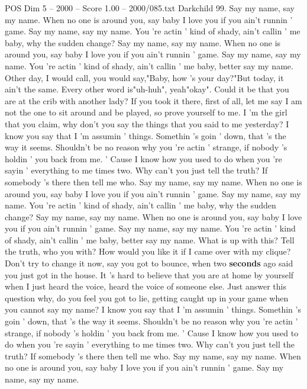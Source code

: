 \begin{textsample}{POS Dim 5 – 2000 – Score 1.00 – 2000/085.txt}  \label{ex:f5_pos_006}
Darkchild 99.
Say my name, say my name.
When no one is around you, say baby I love you if you ain't runnin ' game.
Say my name, say my name.
You 're actin ' kind of shady, ain't callin ' me baby, why the sudden change?
Say my name, say my name.
When no one is around you, say baby I love you if you ain't runnin ' game.
Say my name, say my name.
You 're actin ' kind of shady, ain't callin ' me baby, better say my name.
Other day, I would call, you would say,"Baby, how 's your day?"But today, it ain't the same.
Every other word is"uh-huh", yeah"okay".
Could it be that you are at the crib with another lady?
If you took it there, first of all, let me say I am not the one to sit around and be played, so prove yourself to me.
I 'm the girl that you claim, why don't you say the things that you said to me yesterday?
I know you say that I 'm assumin ' things.
Somethin 's goin ' down, that 's the way it seems.
Shouldn't be no reason why you 're actin ' strange, if nobody 's holdin ' you back from me. ' Cause I know how you used to do when you 're sayin ' everything to me times two.
Why can't you just tell the truth?
If somebody 's there then tell me who.
Say my name, say my name.
When no one is around you, say baby I love you if you ain't runnin ' game.
Say my name, say my name.
You 're actin ' kind of shady, ain't callin ' me baby, why the sudden change?
Say my name, say my name.
When no one is around you, say baby I love you if you ain't runnin ' game.
Say my name, say my name.
You 're actin ' kind of shady, ain't callin ' me baby, better say my name.
What is up with this?
Tell the truth, who you with?
How would you like it if I came over with my clique?
Don't try to change it now, say you got to bounce, when two \textbf{seconds} ago said you just got in the house.
It 's hard to believe that you are at home by yourself when I just heard the voice, heard the voice of someone else.
Just answer this question why, do you feel you got to lie, getting caught up in your game when you cannot say my name?
I know you say that I 'm assumin ' things.
Somethin 's goin ' down, that 's the way it seems.
Shouldn't be no reason why you 're actin ' strange, if nobody 's holdin ' you back from me. ' Cause I know how you used to do when you 're sayin ' everything to me times two.
Why can't you just tell the truth?
If somebody 's there then tell me who.
Say my name, say my name.
When no one is around you, say baby I love you if you ain't runnin ' game.
Say my name, say my name.

\end{textsample}
